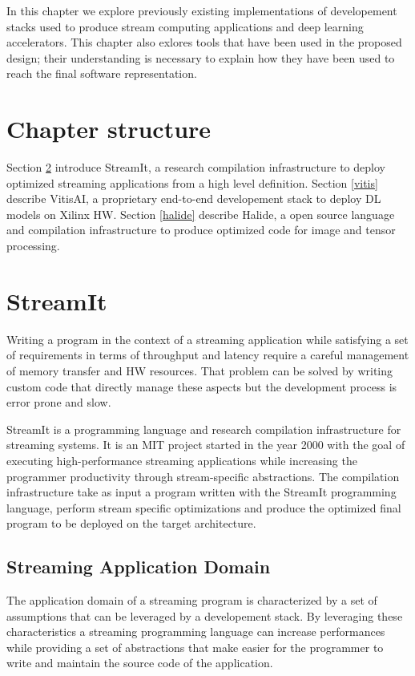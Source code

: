 \documentclass[../main.tex]{subfiles}
\begin{document}
In this chapter we explore previously existing implementations of developement stacks used to produce stream computing applications and deep learning accelerators. 
This chapter also exlores tools that have been used in the proposed design; their understanding is necessary to explain how they have been used to reach the final software representation.

\newpage
\section{Chapter structure}
Section \ref{streamit} introduce StreamIt, a research compilation infrastructure to deploy optimized streaming applications from a high level definition.
Section \ref{vitis} describe VitisAI, a proprietary end-to-end developement stack to deploy DL models on Xilinx HW.
Section \ref{halide} describe Halide, a open source language and compilation infrastructure to produce optimized code for image and tensor processing.


\section{StreamIt}
\label{streamit}

Writing a program in the context of a streaming application while satisfying a set of requirements in terms of throughput and latency require a careful management of memory transfer and HW resources. That problem can be solved by writing custom code that directly manage these aspects but the development process is error prone and slow.

StreamIt is a programming language and research compilation infrastructure for streaming systems. It is an MIT project started in the year 2000 with the goal of executing high-performance streaming applications while increasing the programmer productivity through stream-specific abstractions. The compilation infrastructure take as input a program written with the StreamIt programming language, perform stream specific optimizations and produce the optimized final program to be deployed on the target architecture.

\newpage

\subsection{Streaming Application Domain}
The application domain of a streaming program is characterized by a set of assumptions \cite{streamit1} that can be leveraged by a developement stack. By leveraging these characteristics a streaming programming language can increase performances while providing a set of abstractions that make easier for the programmer to write and maintain the source code of the application.
\end{document}
